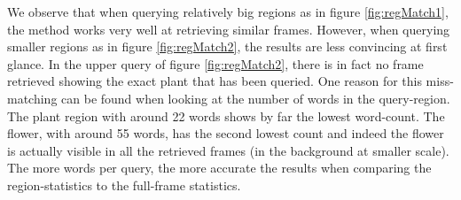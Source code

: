 \documentclass{paper}
\begin{document}
We observe that when querying relatively big regions as in figure \ref{fig:regMatch1}, the method works very well at retrieving similar frames. However, when querying smaller regions as in figure \ref{fig:regMatch2}, the results are less convincing at first glance. In the upper query of figure \ref{fig:regMatch2}, there is in fact no frame retrieved showing the exact plant that has been queried. One reason for this miss-matching can be found when looking at the number of words in the query-region. The plant region with around 22 words shows by far the lowest word-count. The flower, with around 55 words, has the second lowest count and indeed the flower is actually visible in all the retrieved frames (in the background at smaller scale). The more words per query, the more accurate the results when comparing the region-statistics to the full-frame statistics.
\end{document}
